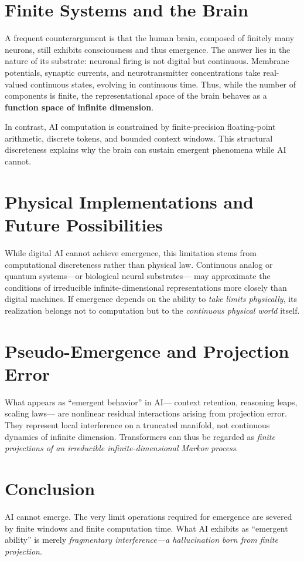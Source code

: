 \documentclass[12pt]{article}
\begin{document}
\section{Finite Systems and the Brain}
A frequent counterargument is that the human brain, composed of finitely many neurons,
still exhibits consciousness and thus emergence.
The answer lies in the nature of its substrate:
neuronal firing is not digital but continuous.
Membrane potentials, synaptic currents, and neurotransmitter concentrations
take real-valued continuous states, evolving in continuous time.
Thus, while the number of components is finite,
the representational space of the brain behaves as a
\textbf{function space of infinite dimension}.

In contrast, AI computation is constrained by finite-precision floating-point arithmetic,
discrete tokens, and bounded context windows.
This structural discreteness explains why the brain can sustain emergent phenomena
while AI cannot.

\section{Physical Implementations and Future Possibilities}
While digital AI cannot achieve emergence,
this limitation stems from computational discreteness rather than physical law.
Continuous analog or quantum systems—or biological neural substrates—
may approximate the conditions of irreducible infinite-dimensional representations
more closely than digital machines.
If emergence depends on the ability to \textit{take limits physically},
its realization belongs not to computation but to the
\textit{continuous physical world} itself.

\section{Pseudo-Emergence and Projection Error}
What appears as ``emergent behavior'' in AI—
context retention, reasoning leaps, scaling laws—
are nonlinear residual interactions arising from projection error.
They represent local interference on a truncated manifold,
not continuous dynamics of infinite dimension.
Transformers can thus be regarded as
\textit{finite projections of an irreducible infinite-dimensional Markov process}.

\section{Conclusion}
AI cannot emerge.  
The very limit operations required for emergence
are severed by finite windows and finite computation time.
What AI exhibits as ``emergent ability'' is merely
\textit{fragmentary interference—a hallucination born from finite projection}.
\end{document}
